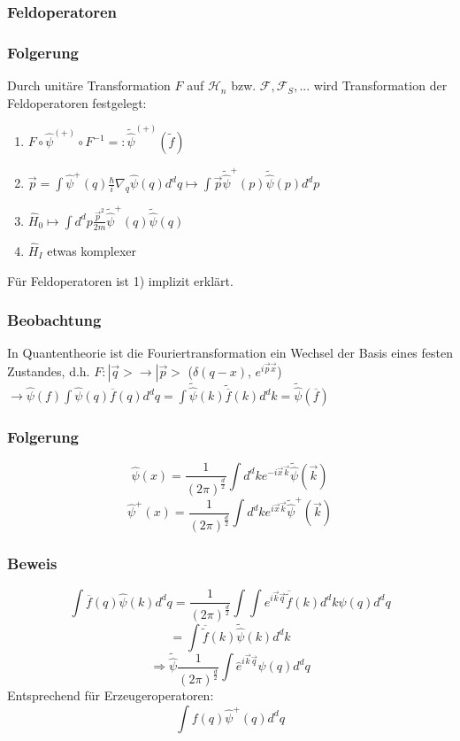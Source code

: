 \documentclass[twoside,a4paper]{scrartcl}
\renewcommand{\1}{\mathds{1}}
\newcommand{\Ra}{\Rightarrow}
\newcommand{\ra}{\rightarrow}
\renewcommand{\H}{\mathcal{H}}
\newcommand{\F}{\mathcal{F}}
\begin{document}
\subsubsection*{Feldoperatoren}
\subsubsection*{Folgerung}
Durch unitäre Transformation $F$ auf $\H_n$ bzw. $\F,\F_S,...$ wird Transformation der Feldoperatoren festgelegt:
\begin{enumerate}
\item $F \circ \hat \psi^{(+)}\circ F^{-1}=:\tilde {\hat \psi}^{(+)}(\tilde f)$
\item $\vec p=\int \hat \psi^+(q) \frac{\hbar}{i} \nabla_q \hat \psi(q)d^dq \mapsto \int \vec p \tilde {\hat \psi}^{+}(p) \tilde {\hat \psi}(p) d^dp $
\item $\hat H_0 \mapsto \int d^dp \frac{\vec p^2}{2m} \tilde {\hat \psi}^{+}(q)\tilde {\hat \psi}(q)$
\item $\hat H_I$ etwas komplexer
\end{enumerate}
Für Feldoperatoren ist 1) implizit erklärt.
\subsubsection*{Beobachtung}
In Quantentheorie ist die Fouriertransformation ein Wechsel der Basis eines festen Zustandes, d.h. $F: |\vec q> \ra |\vec p>$ ($\delta(q-x)$, $e^{i \vec p \vec x}$)\\
$\ra \hat \psi(f)\int \hat \psi(q)\overline{f}(q) d^dq=\int \tilde {\hat \psi}(k) \tilde{\overline{f}}(k)d^dk=\tilde {\hat \psi} (\overline{f}) $
\subsubsection*{Folgerung}
$$\hat \psi(x)=\frac{1}{(2\pi)^{\frac{d}{2}}}\int d^dk e^{-i\vec x\vec k} \tilde {\hat \psi}(\vec k)$$
$$\hat \psi^+(x)=\frac{1}{(2\pi)^{\frac{d}{2}}}\int d^dk e^{i\vec x\vec k} \tilde {\hat \psi}^+(\vec k)$$
\subsubsection*{Beweis}
$$\int \overline{f}(q) \hat \psi(k) d^dq=\frac{1}{(2\pi)^{\frac{d}{2}}} \int \int e^{i \vec k \vec q} \overline{\tilde{f}}(k) d^dk \hat \psi(q) d^dq$$
$$=\int \overline{\tilde{f}}(k) \tilde {\hat \psi}(k) d^dk $$
$$\Ra \tilde {\hat \psi} \frac{1}{(2\pi)^{\frac{d}{2}}}  \int  \hat e^{i \vec k \vec q} \psi(q) d^dq $$
Entsprechend für Erzeugeroperatoren:
$$\int f(q) \hat \psi^+(q)d^dq$$
% 
\end{document}
